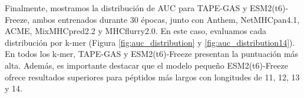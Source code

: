 Finalmente, mostramos la distribución de AUC para TAPE-GAS y ESM2(t6)-Freeze, ambos entrenados durante 30 épocas, junto con Anthem, NetMHCpan4.1, ACME, MixMHCpred2.2 y MHCflurry2.0. En este caso, evaluamos cada distribución por k-mer (Figura \ref{fig:auc_distribution} y \ref{fig:auc_distribution14}). En todos los k-mer, TAPE-GAS y ESM2(t6)-Freeze presentan la puntuación más alta. Además, es importante destacar que el modelo pequeño ESM2(t6)-Freeze ofrece resultados superiores para péptidos más largos con longitudes de 11, 12, 13 y 14.



\begin{figure}[h]
	\centering
	
	

\end{figure}
